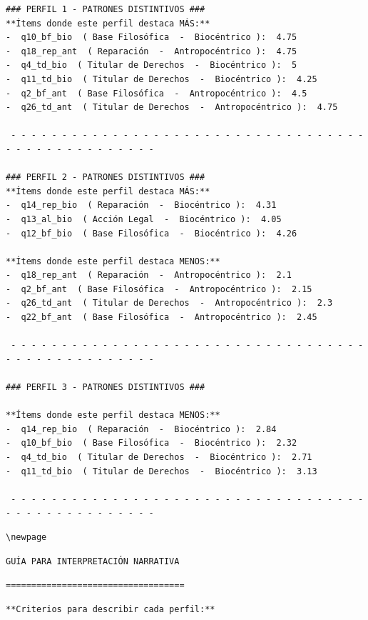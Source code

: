 \documentclass[
  11pt,
  letterpaper,
  DIV=11,
  numbers=noendperiod]{scrartcl}
\begin{document}
\begin{verbatim}
### PERFIL 1 - PATRONES DISTINTIVOS ###
**Ítems donde este perfil destaca MÁS:**
-  q10_bf_bio  ( Base Filosófica  -  Biocéntrico ):  4.75 
-  q18_rep_ant  ( Reparación  -  Antropocéntrico ):  4.75 
-  q4_td_bio  ( Titular de Derechos  -  Biocéntrico ):  5 
-  q11_td_bio  ( Titular de Derechos  -  Biocéntrico ):  4.25 
-  q2_bf_ant  ( Base Filosófica  -  Antropocéntrico ):  4.5 
-  q26_td_ant  ( Titular de Derechos  -  Antropocéntrico ):  4.75 

 - - - - - - - - - - - - - - - - - - - - - - - - - - - - - - - - - - - - - - - - - - - - - - - - - - 

### PERFIL 2 - PATRONES DISTINTIVOS ###
**Ítems donde este perfil destaca MÁS:**
-  q14_rep_bio  ( Reparación  -  Biocéntrico ):  4.31 
-  q13_al_bio  ( Acción Legal  -  Biocéntrico ):  4.05 
-  q12_bf_bio  ( Base Filosófica  -  Biocéntrico ):  4.26 

**Ítems donde este perfil destaca MENOS:**
-  q18_rep_ant  ( Reparación  -  Antropocéntrico ):  2.1 
-  q2_bf_ant  ( Base Filosófica  -  Antropocéntrico ):  2.15 
-  q26_td_ant  ( Titular de Derechos  -  Antropocéntrico ):  2.3 
-  q22_bf_ant  ( Base Filosófica  -  Antropocéntrico ):  2.45 

 - - - - - - - - - - - - - - - - - - - - - - - - - - - - - - - - - - - - - - - - - - - - - - - - - - 

### PERFIL 3 - PATRONES DISTINTIVOS ###

**Ítems donde este perfil destaca MENOS:**
-  q14_rep_bio  ( Reparación  -  Biocéntrico ):  2.84 
-  q10_bf_bio  ( Base Filosófica  -  Biocéntrico ):  2.32 
-  q4_td_bio  ( Titular de Derechos  -  Biocéntrico ):  2.71 
-  q11_td_bio  ( Titular de Derechos  -  Biocéntrico ):  3.13 

 - - - - - - - - - - - - - - - - - - - - - - - - - - - - - - - - - - - - - - - - - - - - - - - - - - 
\end{verbatim}

\begin{verbatim}
\newpage
\end{verbatim}

\begin{verbatim}
GUÍA PARA INTERPRETACIÓN NARRATIVA
\end{verbatim}

\begin{verbatim}
===================================
\end{verbatim}

\begin{verbatim}
**Criterios para describir cada perfil:**
\end{verbatim}
\end{document}
